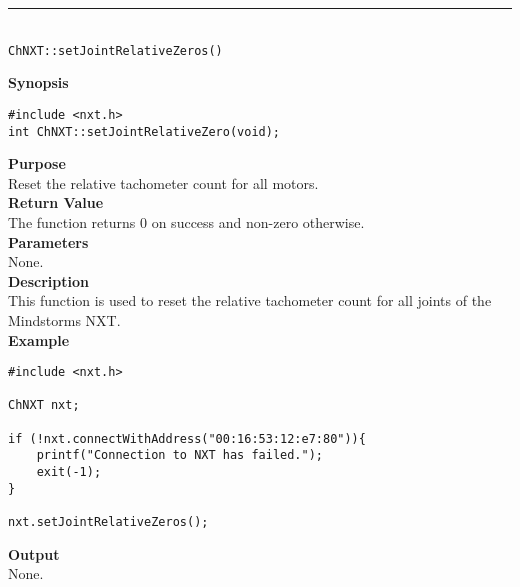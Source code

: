 \noindent
\vspace{5pt}
\rule{4.5in}{0.015in}\\
\noindent
{\LARGE \texttt{ChNXT::setJointRelativeZeros()} }\\


\noindent
{\bf Synopsis}
\vspace{-8pt}
\begin{verbatim}
#include <nxt.h>
int ChNXT::setJointRelativeZero(void);
\end{verbatim}

\noindent
{\bf Purpose}\\
Reset the relative tachometer count for all motors.\\

\noindent
{\bf Return Value}\\
The function returns 0 on success and non-zero otherwise.\\

\noindent
{\bf Parameters}\\
None.\\

\noindent
{\bf Description}\\
This function is used to reset the relative tachometer count for 
all joints of the Mindstorms NXT.\\

\noindent
{\bf Example}
\begin{verbatim}
#include <nxt.h> 

ChNXT nxt;

if (!nxt.connectWithAddress("00:16:53:12:e7:80")){
    printf("Connection to NXT has failed.");
    exit(-1);
}
    
nxt.setJointRelativeZeros();
\end{verbatim}

\noindent
{\bf Output}\\
None.\\
\\
